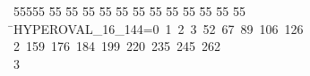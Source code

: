 %
%
\begin{tabbing}
55555 \= 55 \= 55 \= 55 \= 55 \= 55 \= 55 \= 55 \= 55 \= 55 \= 55 \= 55 \= 55 \= \>HYPEROVAL\_16\_144=0\ 1\ 2\ 3\ 52\ 67\ 89\ 106\ 126\ \\[0pt]
2\ 159\ 176\ 184\ 199\ 220\ 235\ 245\ 262\\[0pt]
3\>\end{tabbing}
